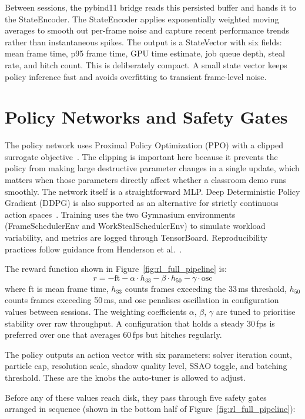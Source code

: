 \documentclass[9pt,openany]{extbook}
\begin{document}
Between sessions, the pybind11 bridge reads this persisted buffer and hands it to the StateEncoder. The StateEncoder applies exponentially weighted moving averages to smooth out per-frame noise and capture recent performance trends rather than instantaneous spikes. The output is a StateVector with six fields: mean frame time, p95 frame time, GPU time estimate, job queue depth, steal rate, and hitch count. This is deliberately compact. A small state vector keeps policy inference fast and avoids overfitting to transient frame-level noise.

\section{Policy Networks and Safety Gates}

The policy network uses Proximal Policy Optimization (PPO) with a clipped surrogate objective~\cite{ppo}. The clipping is important here because it prevents the policy from making large destructive parameter changes in a single update, which matters when those parameters directly affect whether a classroom demo runs smoothly. The network itself is a straightforward MLP. Deep Deterministic Policy Gradient (DDPG) is also supported as an alternative for strictly continuous action spaces~\cite{lillicrap2016ddpg}. Training uses the two Gymnasium environments (FrameSchedulerEnv and WorkStealSchedulerEnv) to simulate workload variability, and metrics are logged through TensorBoard. Reproducibility practices follow guidance from Henderson et al.~\cite{henderson_rl_matters}.

The reward function shown in Figure~\ref{fig:rl_full_pipeline} is:
\[
  r = -\text{ft} - \alpha \cdot h_{33} - \beta \cdot h_{50} - \gamma \cdot \text{osc}
\]
where ft is mean frame time, $h_{33}$ counts frames exceeding the 33\,ms threshold, $h_{50}$ counts frames exceeding 50\,ms, and osc penalises oscillation in configuration values between sessions. The weighting coefficients $\alpha$, $\beta$, $\gamma$ are tuned to prioritise stability over raw throughput. A configuration that holds a steady 30\,fps is preferred over one that averages 60\,fps but hitches regularly.

The policy outputs an action vector with six parameters: solver iteration count, particle cap, resolution scale, shadow quality level, SSAO toggle, and batching threshold. These are the knobs the auto-tuner is allowed to adjust.

Before any of these values reach disk, they pass through five safety gates arranged in sequence (shown in the bottom half of Figure~\ref{fig:rl_full_pipeline}):
\end{document}
